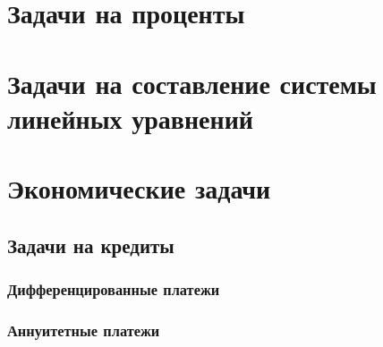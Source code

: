 \chapter{Задачи на проценты}
\chapter{Задачи на составление системы линейных уравнений}
\chapter{Экономические задачи}
	\section{Задачи на кредиты}
		\subsection{Дифференцированные платежи}
		\subsection{Аннуитетные платежи}

